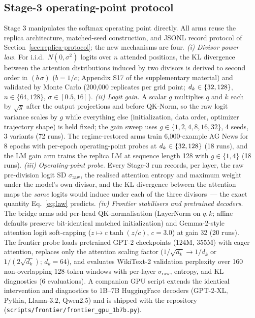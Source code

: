 \subsection{Stage-3 operating-point protocol}\label{sec:stage3-protocol}
Stage 3 manipulates the softmax operating point directly. All arms reuse the
replica architecture, matched-seed construction, and JSONL record protocol of
Section~\ref{sec:replica-protocol}; the new mechanisms are four.
\emph{(i) Divisor power law.} For i.i.d.\ $N(0, \sigma^2)$ logits over $n$
attended positions, the KL divergence between the attention distributions
induced by two divisors is derived to second order in $(b\,\sigma)$
($b = 1/c$; Appendix S17 of the supplementary material) and validated by Monte Carlo
(200{,}000 replicates per grid point; $d_k \in \{32, 128\}$,
$n \in \{64, 128\}$, $\sigma \in [0.5, 16]$).
\emph{(ii) Logit gain.} A scalar $g$ multiplies $q$ and $k$ each by
$\sqrt{g}$ after the output projections and before QK-Norm, so the raw logit
variance scales by $g$ while everything else (initialization, data order,
optimizer trajectory shape) is held fixed; the gain sweep uses
$g \in \{1, 2, 4, 8, 16, 32\}$, 4 seeds, 3 variants (72 runs). The
regime-restored arms train 6{,}000-example AG News for 8 epochs with per-epoch
operating-point probes at $d_k \in \{32, 128\}$ (18 runs), and the LM gain arm
trains the replica LM at sequence length 128 with $g \in \{1, 4\}$
(18 runs).
\emph{(iii) Operating-point probe.} Every Stage-3 run records, per layer, the
raw pre-division logit SD $\sigma_{\text{raw}}$, the realised attention
entropy and maximum weight under the model's own divisor, and the KL
divergence between the attention maps the \emph{same} logits would induce
under each of the three divisors~--- the exact quantity
Eq.~\eqref{eq:law} predicts.
\emph{(iv) Frontier stabilisers and pretrained decoders.} The bridge arms add
per-head QK-normalisation (LayerNorm on $q, k$; affine defaults preserve
bit-identical matched initialization) and Gemma-2-style attention logit
soft-capping ($z \mapsto c \tanh(z/c)$, $c = 3.0$) at gain 32 (20 runs). The
frontier probe loads pretrained GPT-2 checkpoints (124M, 355M) with eager
attention, replaces only the attention scaling factor
($1/\sqrt{d_k} \to 1/d_k$ or $1/(2\sqrt{d_k})$; $d_k = 64$), and evaluates
WikiText-2 validation perplexity over 160 non-overlapping 128-token windows
with per-layer $\sigma_{\text{raw}}$, entropy, and KL diagnostics (6
evaluations). A companion GPU script extends the identical intervention and
diagnostics to 1B--7B HuggingFace decoders (GPT-2-XL, Pythia, Llama-3.2,
Qwen2.5) and is shipped with the repository
(\texttt{scripts/frontier/frontier\_gpu\_1b7b.py}).

